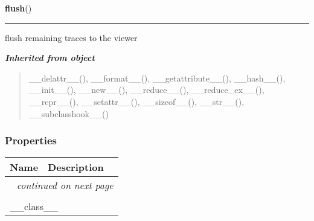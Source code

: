     \label{tracetool:TTrace:flush}

    \vspace{0.5ex}

\hspace{.8\funcindent}\begin{boxedminipage}{\funcwidth}

    \raggedright \textbf{flush}()

    \vspace{-1.5ex}

    \rule{\textwidth}{0.5\fboxrule}
\setlength{\parskip}{2ex}
    flush remaining traces to the viewer

\setlength{\parskip}{1ex}
    \end{boxedminipage}


\large{\textbf{\textit{Inherited from object}}}

\begin{quote}
\_\_delattr\_\_(), \_\_format\_\_(), \_\_getattribute\_\_(), \_\_hash\_\_(), \_\_init\_\_(), \_\_new\_\_(), \_\_reduce\_\_(), \_\_reduce\_ex\_\_(), \_\_repr\_\_(), \_\_setattr\_\_(), \_\_sizeof\_\_(), \_\_str\_\_(), \_\_subclasshook\_\_()
\end{quote}


  \subsubsection{Properties}

    \vspace{-1cm}
\hspace{\varindent}\begin{longtable}{|p{\varnamewidth}|p{\vardescrwidth}|l}
\cline{1-2}
\cline{1-2} \centering \textbf{Name} & \centering \textbf{Description}& \\
\cline{1-2}
\endhead\cline{1-2}\multicolumn{3}{r}{\small\textit{continued on next page}}\\\endfoot\cline{1-2}
\endlastfoot\multicolumn{2}{|l|}{\textit{Inherited from object}}\\
\multicolumn{2}{|p{\varwidth}|}{\raggedright \_\_class\_\_}\\
\cline{1-2}
\end{longtable}


